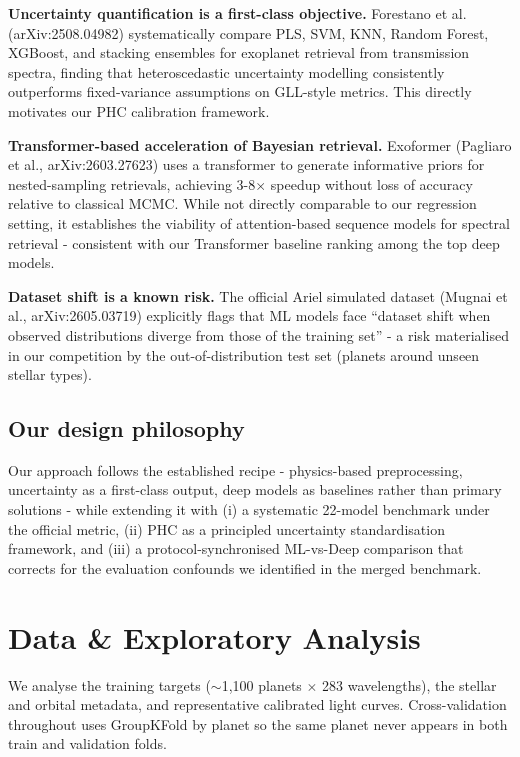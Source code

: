 \documentclass[12pt]{article}
\begin{document}
\textbf{Uncertainty quantification is a first-class objective.} Forestano et al. (arXiv:2508.04982) systematically compare PLS, SVM, KNN, Random Forest, XGBoost, and stacking ensembles for exoplanet retrieval from transmission spectra, finding that heteroscedastic uncertainty modelling consistently outperforms fixed-variance assumptions on GLL-style metrics. This directly motivates our PHC calibration framework.

\textbf{Transformer-based acceleration of Bayesian retrieval.} Exoformer (Pagliaro et al., arXiv:2603.27623) uses a transformer to generate informative priors for nested-sampling retrievals, achieving 3-8$\times$ speedup without loss of accuracy relative to classical MCMC. While not directly comparable to our regression setting, it establishes the viability of attention-based sequence models for spectral retrieval - consistent with our Transformer baseline ranking among the top deep models.

\textbf{Dataset shift is a known risk.} The official Ariel simulated dataset (Mugnai et al., arXiv:2605.03719) explicitly flags that ML models face ``dataset shift when observed distributions diverge from those of the training set'' - a risk materialised in our competition by the out-of-distribution test set (planets around unseen stellar types).

\subsection{Our design philosophy}

Our approach follows the established recipe - physics-based preprocessing, uncertainty as a first-class output, deep models as baselines rather than primary solutions - while extending it with (i) a systematic 22-model benchmark under the official metric, (ii) PHC as a principled uncertainty standardisation framework, and (iii) a protocol-synchronised ML-vs-Deep comparison that corrects for the evaluation confounds we identified in the merged benchmark.


\section{Data \& Exploratory Analysis}

We analyse the training targets ($\sim$1,100 planets $\times$ 283 wavelengths), the stellar and orbital metadata, and representative calibrated light curves. Cross-validation throughout uses GroupKFold by planet so the same planet never appears in both train and validation folds.
\end{document}
